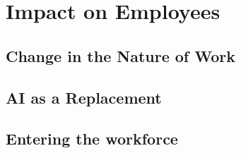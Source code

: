 \documentclass[
]{book}
\begin{document}
\hypertarget{impact-on-employees}{%
\chapter{Impact on Employees}\label{impact-on-employees}}

\hypertarget{change-in-the-nature-of-work}{%
\section{Change in the Nature of Work}\label{change-in-the-nature-of-work}}

\hypertarget{ai-as-a-replacement}{%
\section{AI as a Replacement}\label{ai-as-a-replacement}}

\hypertarget{entering-the-workforce}{%
\section{Entering the workforce}\label{entering-the-workforce}}

  
\end{document}
